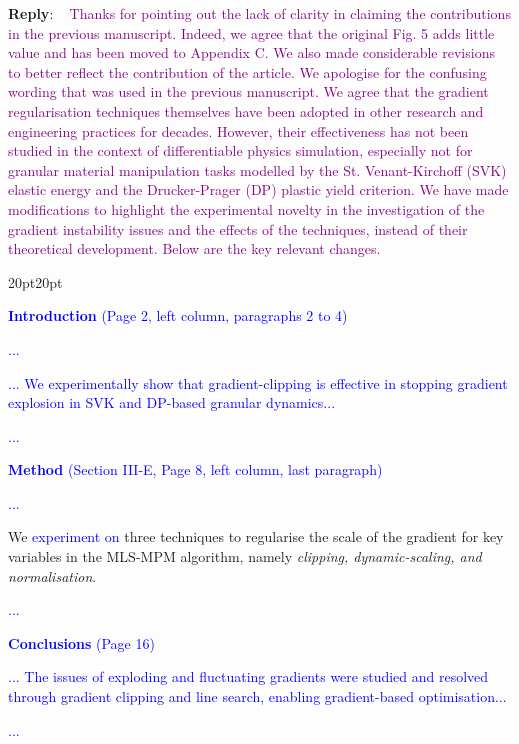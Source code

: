 \documentclass[11pt]{article}
\newcounter{reviewer}
\newcounter{point}[reviewer]
\newenvironment{reply}
   {\medskip \noindent \begin{sf}\textbf{Reply}: \  }
   {\medskip \end{sf}}
\newcommand{\rp}[1]{\textcolor{purple}{#1}}
\newcommand{\xt}[1]{\textcolor{blue}{#1}}
\begin{document}
\begin{reply}
\rp{Thanks for pointing out the lack of clarity in claiming the contributions in the previous manuscript. Indeed, we agree that the original Fig. 5 adds little value and has been moved to Appendix C. We also made considerable revisions to better reflect the contribution of the article. We apologise for the confusing wording that was used in the previous manuscript. We agree that the gradient regularisation techniques themselves have been adopted in other research and engineering practices for decades. However, their effectiveness has not been studied in the context of differentiable physics simulation, especially not for granular material manipulation tasks modelled by the St. Venant-Kirchoff (SVK) elastic energy and the Drucker-Prager (DP) plastic yield criterion. We have made modifications to highlight the experimental novelty in the investigation of the gradient instability issues and the effects of the techniques, instead of their theoretical development. Below are the key relevant changes.}

\begin{adjustwidth}{20pt}{20pt}



\vspace{0.3cm}\noindent\xt{\textbf{Introduction} (Page 2, left column, paragraphs 2 to 4)}

\xt{...}

\xt{... We experimentally show that gradient-clipping is effective in stopping gradient explosion in SVK and DP-based granular dynamics...}

\xt{...}


\vspace{0.3cm}\noindent\xt{\textbf{Method} (Section III-E, Page 8, left column, last paragraph)}

\xt{...}

We \xt{experiment on} three techniques to regularise the scale of the gradient for key variables in the MLS-MPM algorithm, namely \textit{clipping, dynamic-scaling, and normalisation}.

\xt{...}

\vspace{0.3cm}\noindent\xt{\textbf{Conclusions} (Page 16)}

\xt{... The issues of exploding and fluctuating gradients were studied and resolved through gradient clipping and line search, enabling gradient-based optimisation...}

\xt{...}

\end{adjustwidth}

\end{reply}
\end{document}
